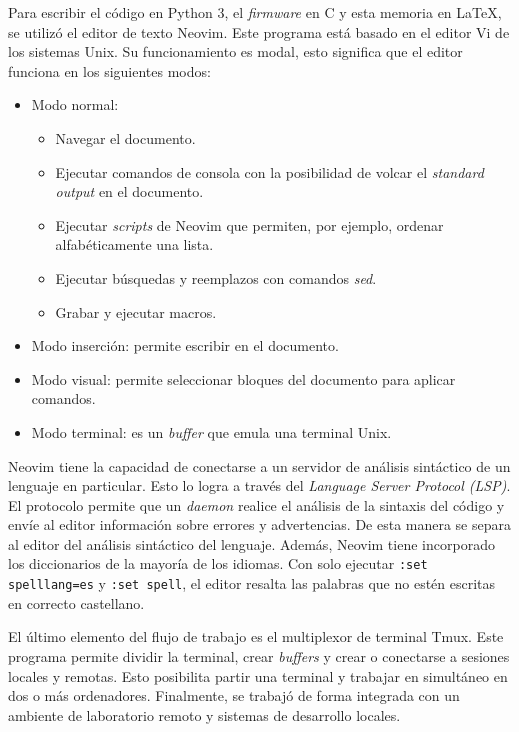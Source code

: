 Para escribir el código en Python 3, el \emph{firmware} en C y esta memoria en \LaTeX, se utilizó el editor de texto Neovim.
Este programa está basado en el editor Vi de los sistemas Unix.
Su funcionamiento es modal, esto significa que el editor funciona en los siguientes modos:

\begin{itemize}
    \item Modo normal:
        \begin{itemize}
            \item Navegar el documento.
            \item Ejecutar comandos de consola con la posibilidad de volcar el \emph{standard output} en el documento.
            \item Ejecutar \emph{scripts} de Neovim que permiten, por ejemplo, ordenar alfabéticamente una lista.
            \item Ejecutar búsquedas y reemplazos con comandos \emph{sed}.
            \item Grabar y ejecutar macros.
        \end{itemize}
    \item Modo inserción: permite escribir en el documento.
    \item Modo visual: permite seleccionar bloques del documento para aplicar comandos.
    \item Modo terminal: es un \emph{buffer} que emula una terminal Unix.
\end{itemize}

Neovim tiene la capacidad de conectarse a un servidor de análisis sintáctico de un lenguaje en particular.
Esto lo logra a través del \emph{Language Server Protocol (LSP)}.
El protocolo permite que un \emph{daemon} realice el análisis de la sintaxis del código y envíe al editor información sobre errores y advertencias.
De esta manera se separa al editor del análisis sintáctico del lenguaje.
Además, Neovim tiene incorporado los diccionarios de la mayoría de los idiomas. Con solo ejecutar \texttt{:set spelllang=es} y \texttt{:set spell}, el editor resalta las palabras que no estén escritas en correcto castellano.

El último elemento del flujo de trabajo es el multiplexor de terminal Tmux.
Este programa permite dividir la terminal, crear \emph{buffers} y crear o conectarse a sesiones locales y remotas.
Esto posibilita partir una terminal y trabajar en simultáneo en dos o más ordenadores.
Finalmente, se trabajó de forma integrada con un ambiente de laboratorio remoto y sistemas de desarrollo locales.

